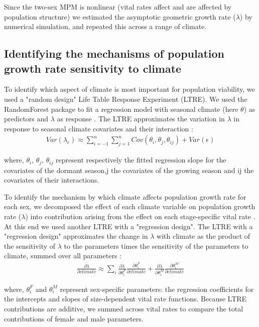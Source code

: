 \documentclass[12pt]{article}
\begin{document}
Since the two-sex MPM is nonlinear (vital rates affect and are affected by population structure) we estimated the asymptotic geometric growth rate ($\lambda$) by numerical simulation, and repeated this across a range of climate.

\subsection*{Identifying the mechanisms of population growth rate sensitivity to climate }
To identify which aspect of climate is most important for population viability, we used a "random design" Life Table Response Experiment (LTRE). 
We used the RandomForest package to fit a regression model with seasonal climate (here $\theta$) as predictors  and $\lambda$ as response \citep{ellner2016data,liaw2002classification}.
The LTRE approximates the variation in $\lambda$ in response to seasonal climate covariates and their interaction \citep{caswell2000matrix,hernandez2023exact}:
\begin{align}\label{eq:ltre}
Var(\lambda_{c})\approx \sum_{i=-1}^{n}\sum_{j=1}^{n} Cov(\theta_{i},\theta_{j},\theta_{ij}) + Var (\epsilon)
\end{align}

\noindent where, $\theta_{i}$, $\theta_{j}$, $\theta_{ij}$  represent respectively the fitted regression slope for the covariates of the dormant season,j the covariates of the growing season and ij the covariates of their interactions. 

To identify the mechanism by which climate affects population growth rate for each sex, we decomposed the effect of each climate variable on population growth rate ($\lambda$) into contribution arising from the effect on each stage-specific vital rate \citep{caswell2000matrix}.
At this end we used another LTRE with a "regression design". 
The LTRE with a "regression design" approximates the change in $\lambda$ with climate as the product of the sensitivity of $\lambda$ to the parameters times the sensitivity of the parameters to climate, summed over all parameters \citep{caswell1989analysis}:
\begin{align}\label{eq:ltresex}
\frac{\partial \lambda}{\partial climate} \approx \sum_{i} \frac{\partial \lambda}{\partial \theta^{F}_{i}} \frac{\partial \theta^{F}_{i}}{\partial climate} + \frac{\partial \lambda}{\partial \theta^{M}_{i}} \frac{\partial \theta^{M}_{i}}{\partial climate}
\end{align}

\noindent where, $\theta^{F}_{i}$ and $\theta^{M}_{i}$ represent sex-specific parameters: the regression coefficients for the intercepts and slopes of size-dependent vital rate functions. 
Because LTRE contributions are additive, we summed across vital rates to compare the total contributions of female and male parameters. 
\end{document}
